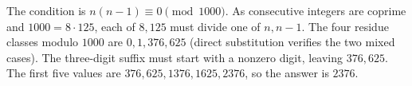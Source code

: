The condition is $n(n-1)\equiv0\pmod{1000}$. As consecutive integers are coprime and $1000=8\cdot125$, each of $8,125$ must divide one of $n,n-1$. The four residue classes modulo $1000$ are $0,1,376,625$ (direct substitution verifies the two mixed cases). The three-digit suffix must start with a nonzero digit, leaving $376,625$. The first five values are $376,625,1376,1625,2376$, so the answer is $\boxed{2376}$.
